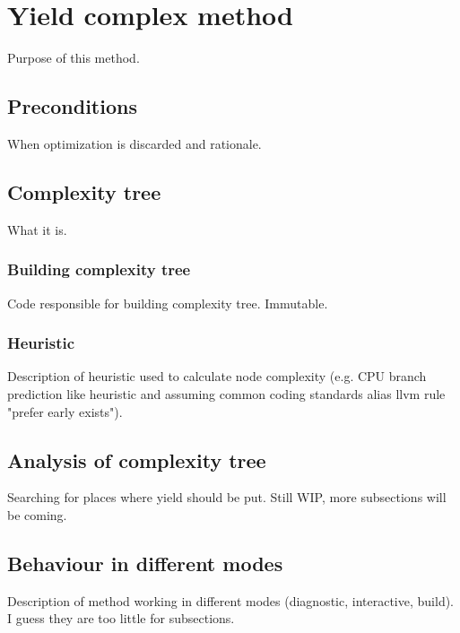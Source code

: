 \chapter{Yield complex method}
Purpose of this method.

\section{Preconditions}
When optimization is discarded and rationale.

\section{Complexity tree}
What it is.

\subsection{Building complexity tree}
Code responsible for building complexity tree. Immutable.

\subsection{Heuristic}
Description of heuristic used to calculate node complexity (e.g. CPU branch prediction like heuristic and assuming common coding standards alias llvm rule "prefer early exists").

\section{Analysis of complexity tree}
Searching for places where yield should be put. Still WIP, more subsections will be coming.

\section{Behaviour in different modes}
Description of method working in different modes (diagnostic, interactive, build). I guess they are too little for subsections.
